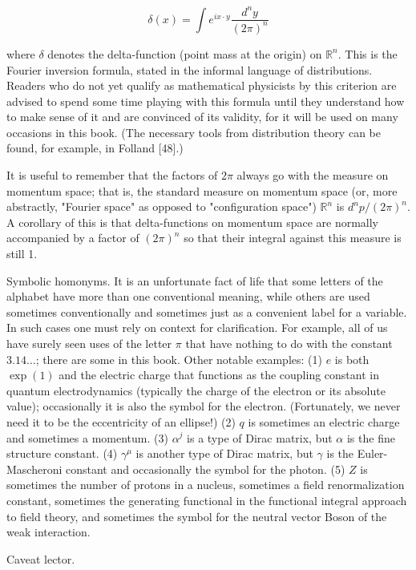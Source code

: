 \documentclass[10pt, letterpaper]{article}
\begin{document}
$$
\delta(x)=\int e^{i x \cdot y} \frac{d^{n} y}{(2 \pi)^{n}}
$$

where $\delta$ denotes the delta-function (point mass at the origin) on $\mathbb{R}^{n}$. This is the Fourier inversion formula, stated in the informal language of distributions. Readers who do not yet qualify as mathematical physicists by this criterion are advised to spend some time playing with this formula until they understand how to make sense of it and are convinced of its validity, for it will be used on many occasions in this book. (The necessary tools from distribution theory can be found, for example, in Folland [48].)

It is useful to remember that the factors of $2 \pi$ always go with the measure on momentum space; that is, the standard measure on momentum space (or, more abstractly, "Fourier space" as opposed to "configuration space") $\mathbb{R}^{n}$ is $d^{n} p /(2 \pi)^{n}$. A corollary of this is that delta-functions on momentum space are normally accompanied by a factor of $(2 \pi)^{n}$ so that their integral against this measure is still 1.

Symbolic homonyms. It is an unfortunate fact of life that some letters of the alphabet have more than one conventional meaning, while others are used sometimes conventionally and sometimes just as a convenient label for a variable. In such cases one must rely on context for clarification. For example, all of us have surely seen uses of the letter $\pi$ that have nothing to do with the constant $3.14 \ldots$; there are some in this book. Other notable examples: (1) $e$ is both $\exp (1)$ and the electric charge that functions as the coupling constant in quantum electrodynamics (typically the charge of the electron or its absolute value); occasionally it is also the symbol for the electron. (Fortunately, we never need it to be the eccentricity of an ellipse!) (2) $q$ is sometimes an electric charge and sometimes a momentum. (3) $\alpha^{j}$ is a type of Dirac matrix, but $\alpha$ is the fine structure constant. (4) $\gamma^{\mu}$ is another type of Dirac matrix, but $\gamma$ is the Euler-Mascheroni constant and occasionally the symbol for the photon. (5) $Z$ is sometimes the number of protons in a nucleus, sometimes a field renormalization constant, sometimes the generating functional in the functional integral approach to field theory, and sometimes the symbol for the neutral vector Boson of the weak interaction.

Caveat lector.
\end{document}
